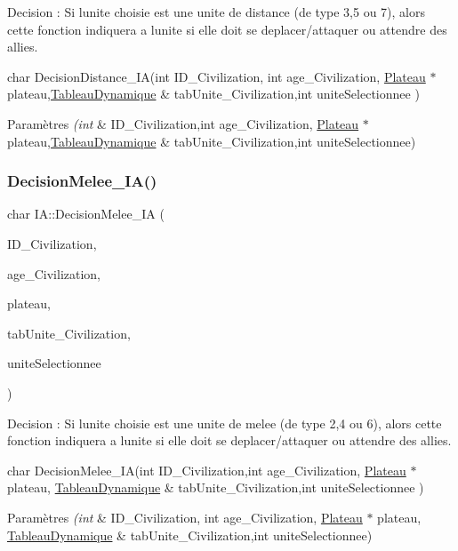 Decision \+: Si l\textquotesingle{}unite choisie est une unite de distance (de type 3,5 ou 7), alors cette fonction indiquera a l\textquotesingle{}unite si elle doit se deplacer/attaquer ou attendre des allies. 

char Decision\+Distance\+\_\+\+IA(int I\+D\+\_\+\+Civilization, int age\+\_\+\+Civilization, \hyperlink{classPlateau}{Plateau} $\ast$ plateau,\hyperlink{classTableauDynamique}{Tableau\+Dynamique} \& tab\+Unite\+\_\+\+Civilization,int unite\+Selectionnee ) 
\begin{DoxyParams}{Paramètres}
{\em (int} & I\+D\+\_\+\+Civilization,int age\+\_\+\+Civilization, \hyperlink{classPlateau}{Plateau} $\ast$ plateau,\hyperlink{classTableauDynamique}{Tableau\+Dynamique} \& tab\+Unite\+\_\+\+Civilization,int unite\+Selectionnee) \\
\hline
\end{DoxyParams}
\mbox{\label{classIA_a0e9087a9086cbbcd1242380855c2db5e}} 
\subsubsection{\texorpdfstring{Decision\+Melee\+\_\+\+I\+A()}{DecisionMelee\_IA()}}
{\footnotesize\ttfamily char I\+A\+::\+Decision\+Melee\+\_\+\+IA (\begin{DoxyParamCaption}\item[{int}]{I\+D\+\_\+\+Civilization,  }\item[{int}]{age\+\_\+\+Civilization,  }\item[{\hyperlink{classPlateau}{Plateau} $\ast$}]{plateau,  }\item[{\hyperlink{classTableauDynamique}{Tableau\+Dynamique} \&}]{tab\+Unite\+\_\+\+Civilization,  }\item[{int}]{unite\+Selectionnee }\end{DoxyParamCaption})}



Decision \+: Si l\textquotesingle{}unite choisie est une unite de melee (de type 2,4 ou 6), alors cette fonction indiquera a l\textquotesingle{}unite si elle doit se deplacer/attaquer ou attendre des allies. 

char Decision\+Melee\+\_\+\+IA(int I\+D\+\_\+\+Civilization,int age\+\_\+\+Civilization, \hyperlink{classPlateau}{Plateau} $\ast$ plateau, \hyperlink{classTableauDynamique}{Tableau\+Dynamique} \& tab\+Unite\+\_\+\+Civilization,int unite\+Selectionnee ) 
\begin{DoxyParams}{Paramètres}
{\em (int} & I\+D\+\_\+\+Civilization, int age\+\_\+\+Civilization, \hyperlink{classPlateau}{Plateau} $\ast$ plateau, \hyperlink{classTableauDynamique}{Tableau\+Dynamique} \& tab\+Unite\+\_\+\+Civilization,int unite\+Selectionnee) \\
\hline
\end{DoxyParams}
\mbox{\label{classIA_a552359a980947191eb5be6a6723aef06}} 
